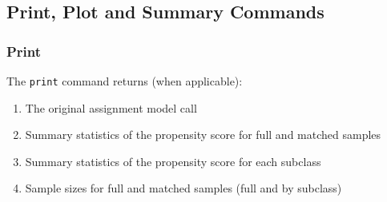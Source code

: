 \documentclass[oneside,letterpaper,titlepage]{article}
\begin{document}

\subsection{Print, Plot and Summary Commands}
\subsubsection{Print}
The \texttt{print} command returns (when applicable):
\begin{enumerate}
\item The original assignment model call 
\item Summary statistics of the propensity score for full and matched
  samples
\item Summary statistics of the propensity score for each subclass
\item Sample sizes for full and matched samples (full and by subclass)
\end{enumerate}
\end{document}
